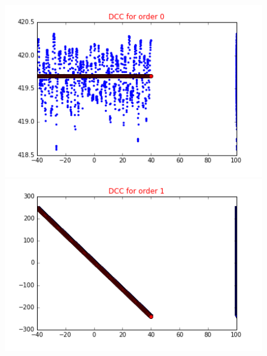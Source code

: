\documentclass[a4,12pt]{article}
\begin{document}
\begin{figure}[h!]
   \begin{minipage}[c]{.46\linewidth}
      \includegraphics[scale=0.5]{../images/dcc/DCC0.png} 
   \end{minipage} \hfill
   \begin{minipage}[c]{.46\linewidth}
      \includegraphics[scale=0.5]{../images/dcc/DCC1.png} 
   \end{minipage}
\end{figure}
\end{document}
